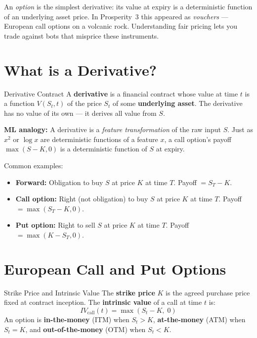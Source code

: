 \documentclass[12pt,a4paper,openany]{report}
\theoremstyle{definition}
\begin{document}
An \emph{option} is the simplest derivative: its value at expiry is a deterministic function of an underlying asset price. In Prosperity~3 this appeared as \emph{vouchers} — European call options on a volcanic rock. Understanding fair pricing lets you trade against bots that misprice these instruments.

\section{What is a Derivative?}

\begin{definitionbox}{Derivative Contract}
A \textbf{derivative} is a financial contract whose value at time $t$ is a function $V(S_t, t)$ of the price $S_t$ of some \textbf{underlying asset}. The derivative has no value of its own — it derives all value from $S$.
\end{definitionbox}

\textbf{ML analogy:} A derivative is a \emph{feature transformation} of the raw input $S$. Just as $x^2$ or $\log x$ are deterministic functions of a feature $x$, a call option's payoff $\max(S-K, 0)$ is a deterministic function of $S$ at expiry.

Common examples:
\begin{itemize}
  \item \textbf{Forward:} Obligation to buy $S$ at price $K$ at time $T$. Payoff $= S_T - K$.
  \item \textbf{Call option:} Right (not obligation) to buy $S$ at price $K$ at time $T$. Payoff $= \max(S_T - K, 0)$.
  \item \textbf{Put option:} Right to sell $S$ at price $K$ at time $T$. Payoff $= \max(K - S_T, 0)$.
\end{itemize}

\section{European Call and Put Options}

\begin{definitionbox}{Strike Price and Intrinsic Value}
The \textbf{strike price} $K$ is the agreed purchase price fixed at contract inception.
The \textbf{intrinsic value} of a call at time $t$ is:
\[
  IV_{\text{call}}(t) = \max(S_t - K,\; 0)
\]
An option is \textbf{in-the-money} (ITM) when $S_t > K$, \textbf{at-the-money} (ATM) when $S_t = K$, and \textbf{out-of-the-money} (OTM) when $S_t < K$.
\end{definitionbox}
\end{document}
